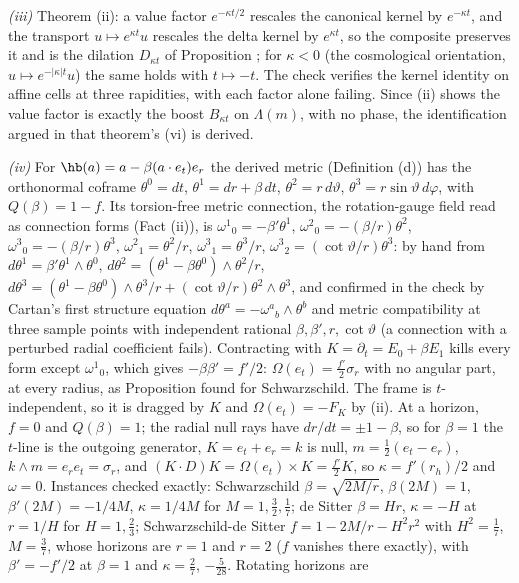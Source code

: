 \emph{(iii)} Theorem (ii): a value factor $e^{-\kappa t/2}$ rescales the canonical kernel by $e^{-\kappa t}$, and the transport $u \mapsto e^{\kappa t}u$ rescales the delta kernel by $e^{\kappa t}$, so the composite preserves it and is the dilation $D_{\kappa t}$ of Proposition ; for $\kappa < 0$ (the cosmological orientation, $u \mapsto e^{-|\kappa|t}u$) the same holds with $t \mapsto -t$. The check verifies the kernel identity on affine cells at three rapidities, with each factor alone failing. Since (ii) shows the value factor is exactly the boost $B_{\kappa t}$ on $\Lambda(m)$, with no phase, the identification argued in that theorem's (vi) is derived.

\emph{(iv)} For $\hb(a) = a - \beta(a\cdot e_{t})e_{r}$ the derived metric (Definition (d)) has the orthonormal coframe $\theta^{0} = dt$, $\theta^{1} = dr + \beta\,dt$, $\theta^{2} = r\,d\vartheta$, $\theta^{3} = r\sin\vartheta\,d\varphi$, with $Q(\beta) = 1 - f$. Its torsion-free metric connection, the rotation-gauge field read as connection forms (Fact (ii)), is $\omega^{1}{}_{0} = -\beta'\theta^{1}$, $\omega^{2}{}_{0} = -(\beta/r)\theta^{2}$, $\omega^{3}{}_{0} = -(\beta/r)\theta^{3}$, $\omega^{2}{}_{1} = \theta^{2}/r$, $\omega^{3}{}_{1} = \theta^{3}/r$, $\omega^{3}{}_{2} = (\cot\vartheta/r)\theta^{3}$: by hand from $d\theta^{1} = \beta'\theta^{1}\wedge\theta^{0}$, $d\theta^{2} = (\theta^{1} - \beta\theta^{0})\wedge\theta^{2}/r$, $d\theta^{3} = (\theta^{1} - \beta\theta^{0})\wedge\theta^{3}/r + (\cot\vartheta/r)\theta^{2}\wedge\theta^{3}$, and confirmed in the check by Cartan's first structure equation $d\theta^{a} = -\omega^{a}{}_{b}\wedge\theta^{b}$ and metric compatibility at three sample points with independent rational $\beta, \beta', r, \cot\vartheta$ (a connection with a perturbed radial coefficient fails). Contracting with $K = \partial_{t} = E_{0} + \beta E_{1}$ kills every form except $\omega^{1}{}_{0}$, which gives $-\beta\beta' = f'/2$: $\Omega(e_{t}) = \tfrac{f'}{2}\sigma_{r}$ with no angular part, at every radius, as Proposition  found for Schwarzschild. The frame is $t$-independent, so it is dragged by $K$ and $\Omega(e_{t}) = -F_{K}$ by (ii). At a horizon, $f = 0$ and $Q(\beta) = 1$; the radial null rays have $dr/dt = \pm1 - \beta$, so for $\beta = 1$ the $t$-line is the outgoing generator, $K = e_{t} + e_{r} = k$ is null, $m = \tfrac12(e_{t} - e_{r})$, $k\wedge m = e_{r}e_{t} = \sigma_{r}$, and $(K\cdot D)K = \Omega(e_{t})\times K = \tfrac{f'}{2}K$, so $\kappa = f'(r_{h})/2$ and $\omega = 0$. Instances checked exactly: Schwarzschild $\beta = \sqrt{2M/r}$, $\beta(2M) = 1$, $\beta'(2M) = -1/4M$, $\kappa = 1/4M$ for $M = 1, \tfrac32, \tfrac17$; de Sitter $\beta = Hr$, $\kappa = -H$ at $r = 1/H$ for $H = 1, \tfrac23$; Schwarzschild-de Sitter $f = 1 - 2M/r - H^{2}r^{2}$ with $H^{2} = \tfrac17$, $M = \tfrac37$, whose horizons are $r = 1$ and $r = 2$ ($f$ vanishes there exactly), with $\beta' = -f'/2$ at $\beta = 1$ and $\kappa = \tfrac27$, $-\tfrac{5}{28}$. Rotating horizons are 